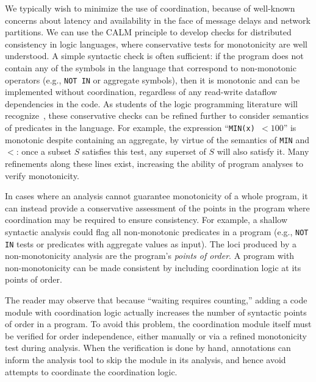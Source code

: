 We typically wish to minimize the use of coordination, because of well-known
concerns about latency and availability in the face of message delays and
network partitions.  We can use the CALM principle to develop checks for
distributed consistency in logic languages, where conservative tests for
monotonicity are well understood. A simple syntactic check is often sufficient:
if the program does not contain any of the symbols in the language that
correspond to non-monotonic operators (e.g., \texttt{NOT IN} or aggregate
symbols), then it is monotonic and can be implemented without coordination,
regardless of any read-write dataflow dependencies in the code.  As students of the logic programming literature will recognize~\cite{local-strat,ross-modular,ross-strat}, these conservative
checks can be refined further to consider semantics of predicates in the
language. For example, the expression ``\texttt{MIN(x) $< 100$}'' is monotonic
despite containing an aggregate, by virtue of the semantics of \texttt{MIN} and
$<$: once a subset $S$ satisfies this test, any superset of $S$ will also
satisfy it.  Many refinements along these lines exist, increasing the ability
of program analyses to verify monotonicity.
% 

In cases where an analysis cannot guarantee monotonicity of a whole program, it
can instead provide a conservative assessment of the points in the program where
coordination may be required to ensure consistency.  For example, a shallow
syntactic analysis could flag all non-monotonic predicates in a program (e.g.,
\texttt{NOT IN} tests or predicates with aggregate values as input). The loci
produced by a non-monotonicity analysis are the program's \emph{points of order}. A program
with non-monotonicity can be made consistent by including coordination logic at
its points of order.

The reader may observe that because ``waiting requires counting,'' adding a code
module with coordination logic actually increases the number of syntactic points
of order in a program.  To avoid this problem, the coordination module itself
must be verified for order independence, either manually or via a refined
monotonicity test during analysis.  When the verification is done by hand,
annotations can inform the analysis tool to skip the module in its analysis, and
hence avoid attempts to coordinate the coordination logic.

